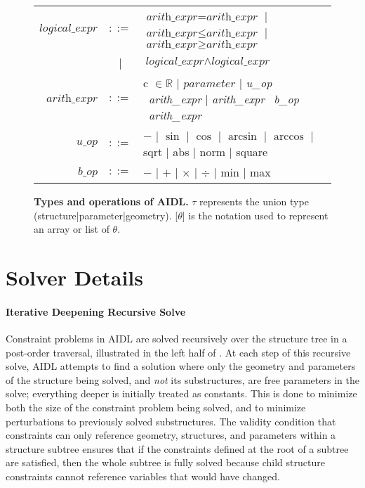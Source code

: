 \begin{figure*}[htbp]
\begin{tabular}{rcl}
$\textit{logical\_expr}$ & $::=$ & $\textit{arith\_expr} = \textit{arith\_expr}$ \: | \: $\textit{arith\_expr} \leq \textit{arith\_expr}$ \: | \: $\textit{arith\_expr} \geq \textit{arith\_expr}$ \\
                         & | & $\textit{logical\_expr} \land \textit{logical\_expr}$ \\
$\textit{arith\_expr}$ & $::=$ & c $\in \mathbb{R}$ \: | \: $parameter$ \: | \: \textit{u\_op} \ \textit{arith\_expr} \: | \: \textit{arith\_expr} \ \textit{b\_op} \ \textit{arith\_expr} \\
$\textit{u\_op}$ & $::=$ & $-$ \: | \: $\sin$ \: | \: $\cos$  \: | \: $\arcsin$ \: | \: $\arccos$ \: | \: sqrt \: | \: abs \: | \: norm \: | \: square \\
$\textit{b\_op}$ & $::=$ & $-$ \: | \: $+$ \: | \: $\times$ \: | \: $\div$ \: | \: min \: | \: max \\
\bottomrule
\end{tabular}
\caption{\textbf{Types and operations of AIDL.} $\tau$ represents the union type (structure|parameter|geometry). [$\theta$] is the notation used to represent an array or list of $\theta$. }
\label{fig:language-grammar}
\end{figure*}

\section{Solver Details}
\label{app:solver}

\paragraph{Iterative Deepening Recursive Solve}
Constraint problems in AIDL are solved recursively over the structure tree in a post-order traversal, illustrated in the left half of . At each step of this recursive solve, AIDL attempts to find a solution where only the geometry and parameters of the structure being solved, and \emph{not} its substructures, are free parameters in the solve; everything deeper is initially treated as constants. This is done to minimize both the size of the constraint problem being solved, and to minimize perturbations to previously solved substructures. The validity condition that constraints can only reference geometry, structures, and parameters within a structure subtree ensures that if the constraints defined at the root of a subtree are satisfied, then the whole subtree is fully solved because child structure constraints cannot reference variables that would have changed.


